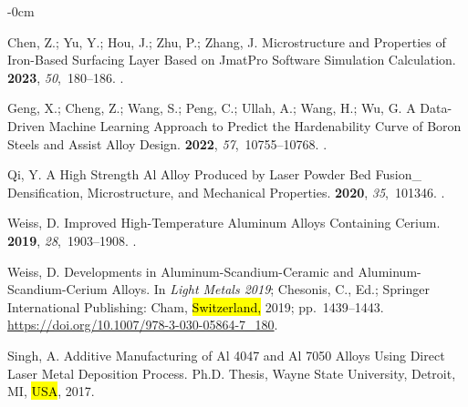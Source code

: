 \documentclass[metals,article,accept,pdftex,moreauthors]{Definitions/mdpi}
\begin{document}
\begin{adjustwidth}{-\extralength}{0cm}
\begin{thebibliography}{999}

Chen, Z.; Yu, Y.; Hou, J.; Zhu, P.; Zhang, J.
\newblock Microstructure and Properties of Iron-Based Surfacing Layer Based on
  {{JmatPro}} Software Simulation Calculation.
 {\bf 2023}, {\em 50},~180--186.
.

Geng, X.; Cheng, Z.; Wang, S.; Peng, C.; Ullah, A.; Wang, H.; Wu, G.
\newblock A Data-Driven Machine Learning Approach to Predict the Hardenability
  Curve of Boron Steels and Assist Alloy Design.
 {\bf 2022}, {\em
  57},~10755--10768.
.

Qi, Y.
\newblock A High Strength {{Al}} Alloy Produced by Laser
  Powder Bed Fusion\_ {{Densification}}, Microstructure, and Mechanical
  Properties.
 {\bf 2020}, {\em 35},~101346.
.

Weiss, D.
\newblock Improved {{High-Temperature Aluminum Alloys Containing Cerium}}.
 {\bf 2019},
  {\em 28},~1903--1908.
.

Weiss, D.
Developments in Aluminum-Scandium-Ceramic and Aluminum-Scandium-Cerium Alloys. 
In {\em Light Metals 2019}; Chesonis, C., Ed.; 
Springer International Publishing: Cham, \hl{Switzerland,} 2019; \mbox{pp. 1439--1443}.
{\url{https://doi.org/10.1007/978-3-030-05864-7\_180}}.

Singh, A. Additive Manufacturing of Al 4047 and Al 7050 Alloys Using Direct Laser Metal Deposition Process.
Ph.D. Thesis, Wayne State University, Detroit, MI, \hl{USA}, 2017.


\end{thebibliography}
\end{adjustwidth}
\end{document}
